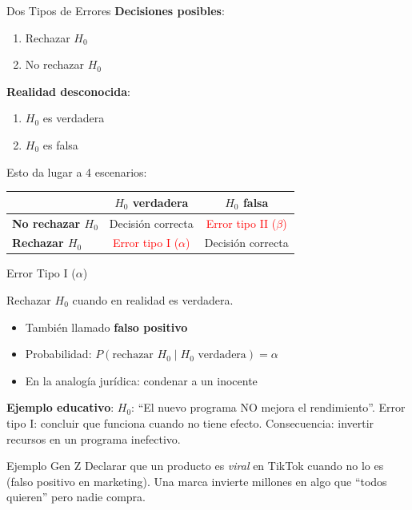 \documentclass[aspectratio=169, 11pt]{beamer}
\begin{document}
\begin{frame}{Dos Tipos de Errores}
\textbf{Decisiones posibles}:
\begin{enumerate}
  \item Rechazar $H_0$
  \item No rechazar $H_0$
\end{enumerate}

\vspace{0.3cm}
\textbf{Realidad desconocida}:
\begin{enumerate}
  \item $H_0$ es verdadera
  \item $H_0$ es falsa
\end{enumerate}

\vspace{0.3cm}
Esto da lugar a 4 escenarios:
\begin{table}
\centering
\small
\begin{tabular}{lcc}
\toprule
& \textbf{$H_0$ verdadera} & \textbf{$H_0$ falsa} \\
\midrule
\textbf{No rechazar $H_0$} & Decisión correcta & \textcolor{red}{Error tipo II ($\beta$)} \\
\textbf{Rechazar $H_0$} & \textcolor{red}{Error tipo I ($\alpha$)} & Decisión correcta \\
\bottomrule
\end{tabular}
\end{table}
\end{frame}

\begin{frame}{Error Tipo I ($\alpha$)}
\begin{definition}
Rechazar $H_0$ cuando en realidad es \alert{verdadera}.
\end{definition}

\vspace{0.2cm}
\begin{itemize}
  \item También llamado \textbf{falso positivo}
  \item Probabilidad: $P(\text{rechazar } H_0 \mid H_0 \text{ verdadera}) = \alpha$
  \item En la analogía jurídica: condenar a un inocente
\end{itemize}

\vspace{0.2cm}
\textbf{Ejemplo educativo}: $H_0$: ``El nuevo programa NO mejora el rendimiento''. Error tipo I: concluir que funciona cuando no tiene efecto. Consecuencia: invertir recursos en un programa inefectivo.

\begin{exampleblock}{Ejemplo Gen Z}
Declarar que un producto es \textit{viral} en TikTok cuando no lo es (falso positivo en marketing). Una marca invierte millones en algo que ``todos quieren'' pero nadie compra.
\end{exampleblock}
\end{frame}
\end{document}
